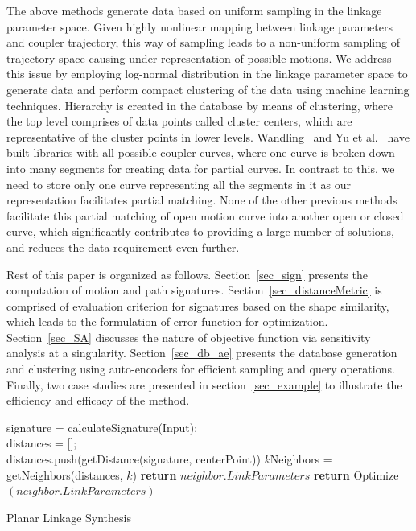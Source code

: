 \documentclass[twocolumn,10pt]{asme2ej}
\begin{document}
The above methods generate data based on uniform sampling in the linkage parameter space.
Given highly nonlinear mapping between linkage parameters and coupler trajectory, this way of sampling leads to a non-uniform sampling of trajectory space causing under-representation of possible motions.
We address this issue by employing log-normal distribution in the linkage parameter space to generate data and perform compact clustering of the data using machine learning techniques.
Hierarchy is created in the database by means of clustering, where the top level comprises of data points called cluster centers, which are representative of the cluster points in lower levels.
Wandling~\cite{wandling2000} and Yu et al.~\cite{yue-pathgen2011} have built libraries with all possible coupler curves, where one curve is broken down into many segments for creating data for partial curves.
In contrast to this, we need to store only one curve representing all the segments in it as our representation facilitates partial matching.
None of the other previous methods facilitate this partial matching of open motion curve into another open or closed curve, which significantly contributes to providing a large number of solutions, and reduces the data requirement even further.

Rest of this paper is organized as follows. Section~\ref{sec_sign} presents the computation of motion and path signatures.
Section~\ref{sec_distanceMetric} is comprised of evaluation criterion for signatures based on the shape similarity, which leads to the formulation of error function for optimization.
Section~\ref{sec_SA} discusses the nature of objective function via sensitivity analysis at a singularity.
Section~\ref{sec_db_ae} presents the database generation and clustering using auto-encoders for efficient sampling and query operations.
Finally, two case studies are presented in section~\ref{sec_example} to illustrate the efficiency and efficacy of the method.

\begin{algorithm}
    signature = calculateSignature(Input); \\
    distances = [];\\
    {
      distances.push(getDistance(signature, centerPoint))
    }
    $k$Neighbors = getNeighbors(distances, $k$)
    {
      {
        \textbf{return} $neighbor.LinkParameters$
      }
      {
        \textbf{return} Optimize$(neighbor.LinkParameters)$
      }
    }
    \caption{Planar Linkage Synthesis}
    \label{alg_overall}
\end{algorithm}
\end{document}
